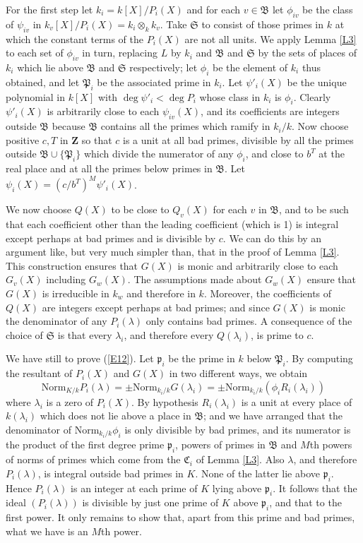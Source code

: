 \documentclass[12pt]{article}
\def\bZ{{\mathbf Z}}
\def\fB{{\mathfrak B}}
\def\fC{{\mathfrak C}}
\def\fp{{\mathfrak p}}
\def\fP{{\mathfrak P}}
\def\fS{{\mathfrak S}}
\def\gl{{\lambda}}
\def\beq{\begin{equation} \label}
\begin{document}
For the first step let $k_i=k[X]/P_i(X)$ and for each
$v\in\fB$ let $\phi_{iv}$ be the class of $\psi_{iv}$ in
$k_v[X]/P_i(X)=k_i\otimes_kk_v$. Take $\fS$ to consist of those primes in $k$
at which the constant terms of the $P_i(X)$ are not all
units. We apply Lemma \ref{L3} to each set of
$\phi_{iv}$ in turn, replacing $L$ by $k_i$ and $\fB$ and $\fS$ by the sets of
places of $k_i$ which lie above $\fB$ and $\fS$ respectively; let $\phi_i$ be
the element of $k_i$ thus obtained, and let $\fP_i$ be the associated prime
in $k_i$.
Let $\psi'_i(X)$ be the unique polynomial in $k[X]$ with $\deg\psi'_i<
\deg P_i$ whose class in $k_i$ is $\phi_i$.
Clearly $\psi'_i(X)$ is arbitrarily close to each $\psi_{iv}(X)$, and its
coefficients are integers outside $\fB$ because $\fB$ contains all the
primes which ramify in $k_i/k$. Now choose positive $c,T$ in $\bZ$ so that $c$
is a unit at all bad primes, divisible by all the primes outside $\fB\cup\{
\fP_i\}$ which divide the numerator of any $\phi_i$,
and close to $b^T$ at the real place and at all the primes below primes
in $\fB$. Let $\psi_i(X)=(c/b^T)^M\psi'_i(X)$.

We now choose $Q(X)$ to be close to $Q_v(X)$ for each $v$ in $\fB$, and to be
such that each coefficient other than the leading coefficient
(which is 1) is integral except perhaps at bad primes
and is divisible by $c$. We can do this by an argument like,
but very much simpler than, that in the proof of Lemma \ref{L3}.
This construction ensures that $G(X)$ is monic and arbitrarily
close to each $G_v(X)$ including $G_w(X)$.
The assumptions made about $G_w(X)$ ensure that $G(X)$
is irreducible in $k_w$ and therefore in $k$. Moreover, the coefficients of
$Q(X)$ are integers except perhaps at bad primes; and since $G(X)$ is monic
the denominator of any $P_i(\gl)$ only contains bad primes.
A consequence
of the choice of $\fS$ is that every $\gl_i$, and therefore every $Q(\gl_i)$,
is prime to $c$.

We have still to prove (\ref{E12}). Let $\fp_i$ be the prime in $k$ below
$\fP_i$.
By computing the resultant of $P_i(X)$ and $G(X)$ in two different ways, we
obtain
\beq{E10} {\mathrm{Norm}}_{K/k}P_i(\gl)=\pm{\mathrm{Norm}}_{k_i/k}G(\gl_i)
=\pm{\mathrm{Norm}}_{k_i/k}(\phi_iR_i(\gl_i)) \end{equation}
where $\gl_i$ is a zero of $P_i(X)$. By hypothesis $R_i(\gl_i)$ is
a unit at every place of $k(\gl_i)$ which does not lie above a place in
$\fB$; and we have arranged that the denominator of
Norm$_{k_i/k}\phi_i$ is only divisible by bad primes,
and its numerator is the product of the
first degree prime $\fp_i$, powers of primes in $\fB$ and $M$th powers of
norms of primes which come from the $\fC_i$
of Lemma \ref{L3}. Also $\gl$, and therefore $P_i(\gl)$, is integral
outside bad primes in $K$.
None of the latter lie above $\fp_i$. Hence
$P_i(\gl)$ is an integer at each prime of $K$ lying above $\fp_i$. It
follows that the ideal $(P_i(\gl))$ is divisible by just one prime of $K$
above $\fp_i$, and that to the first power. It only remains to show that,
apart from this prime and bad primes, what
we have is an $M$th power.
\end{document}
